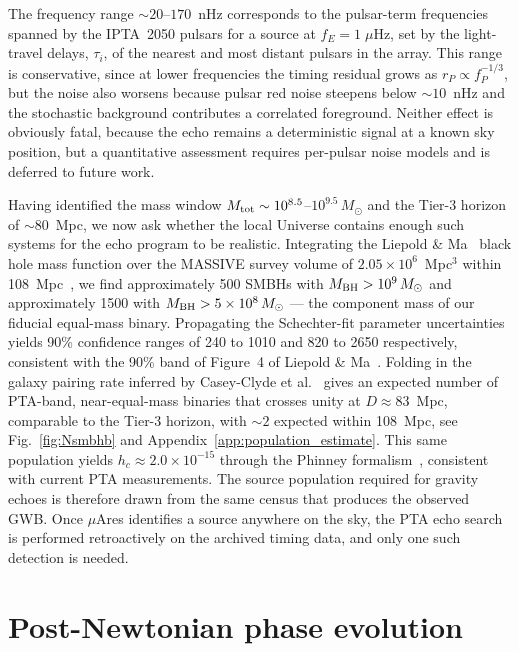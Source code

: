 \documentclass[aps,prx,twocolumn,superscriptaddress,nofootinbib,longbibliography]{revtex4-2}
\begin{document}
The frequency range $\sim20$--$170$~nHz corresponds to the pulsar-term frequencies spanned by the IPTA~2050 pulsars for a source at $f_E = 1\;\mu$Hz, set by the light-travel delays, $\tau_i$, of the nearest and most distant pulsars in the array. This range is conservative, since at lower frequencies the timing residual grows as $r_P \propto f_P^{-1/3}$, but the noise also worsens because pulsar red noise steepens below $\sim10$~nHz and the stochastic background contributes a correlated foreground. Neither effect is obviously fatal, because the echo remains a deterministic signal at a known sky position, but a quantitative assessment requires per-pulsar noise models and is deferred to future work.

Having identified the mass window $M_{\rm tot}\sim10^{8.5}$--$10^{9.5}\,M_\odot$ and the Tier-3 horizon of $\sim80$~Mpc, we now ask whether the local Universe contains enough such systems for the echo program to be realistic. Integrating the Liepold \& Ma~\cite{LiepoldMa2024} black hole mass function over the MASSIVE survey volume of $2.05\times10^6$~Mpc$^3$ within 108~Mpc~\cite{Ma2014}, we find approximately 500 SMBHs with $M_{\rm BH}>10^9\,M_\odot$ and approximately 1500 with $M_{\rm BH}>5\times10^8\,M_\odot$ --- the component mass of our fiducial equal-mass binary. Propagating the Schechter-fit parameter uncertainties yields 90\% confidence ranges of 240 to 1010 and 820 to 2650 respectively, consistent with the 90\% band of Figure~4 of Liepold \& Ma~\cite{LiepoldMa2024}. Folding in the galaxy pairing rate inferred by Casey-Clyde et al.~\cite{CaseyClyde2025} gives an expected number of PTA-band, near-equal-mass binaries that crosses unity at $D\approx83$~Mpc, comparable to the Tier-3 horizon, with $\sim2$ expected within 108~Mpc, see Fig.~\ref{fig:Nsmbhb} and Appendix~\ref{app:population_estimate}. This same population yields $h_c\approx2.0\times10^{-15}$ through the Phinney formalism~\cite{Phinney2001}, consistent with current PTA measurements. The source population required for gravity echoes is therefore drawn from the same census that produces the observed GWB. Once $\mu$Ares identifies a source anywhere on the sky, the PTA echo search is performed retroactively on the archived timing data, and only one such detection is needed.


\section{Post-Newtonian phase evolution}\label{sec:phase}
\end{document}
